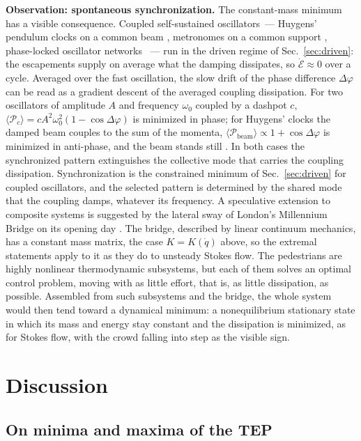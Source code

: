 \documentclass[aip,pof,reprint,amsmath,amssymb,longbibliography]{revtex4-2}
\begin{document}
\textbf{Observation: spontaneous synchronization.} The constant-mass minimum has a visible consequence. Coupled self-sustained oscillators~--- Huygens' pendulum clocks on a common beam \cite{bennett2002}, metronomes on a common support \cite{pantaleone2002}, phase-locked oscillator networks \cite{pikovsky2001}~--- run in the driven regime of Sec.~\ref{sec:driven}: the escapements supply on average what the damping dissipates, so $\dot{\mathscr{E}} \approx 0$ over a cycle. Averaged over the fast oscillation, the slow drift of the phase difference $\Delta\varphi$ can be read as a gradient descent of the averaged coupling dissipation. For two oscillators of amplitude $A$ and frequency $\omega_0$ coupled by a dashpot $c$, $\langle \mathcal{P}_c \rangle = c A^2 \omega_0^2 (1 - \cos\Delta\varphi)$ is minimized in phase; for Huygens' clocks the damped beam couples to the sum of the momenta, $\langle \mathcal{P}_{\mathrm{beam}} \rangle \propto 1 + \cos\Delta\varphi$ is minimized in anti-phase, and the beam stands still \cite{bennett2002}. In both cases the synchronized pattern extinguishes the collective mode that carries the coupling dissipation. Synchronization is the constrained minimum of Sec.~\ref{sec:driven} for coupled oscillators, and the selected pattern is determined by the shared mode that the coupling damps, whatever its frequency. A speculative extension to composite systems is suggested by the lateral sway of London's Millennium Bridge on its opening day \cite{strogatz2005}. The bridge, described by linear continuum mechanics, has a constant mass matrix, the case $K = K(\dot{q})$ above, so the extremal statements apply to it as they do to unsteady Stokes flow. The pedestrians are highly nonlinear thermodynamic subsystems, but each of them solves an optimal control problem, moving with as little effort, that is, as little dissipation, as possible. Assembled from such subsystems and the bridge, the whole system would then tend toward a dynamical minimum: a nonequilibrium stationary state in which its mass and energy stay constant and the dissipation is minimized, as for Stokes flow, with the crowd falling into step as the visible sign.

\section{Discussion}
\label{sec:discussion}

\subsection{On minima and maxima of the TEP}
\label{sec:minmax}
\end{document}
